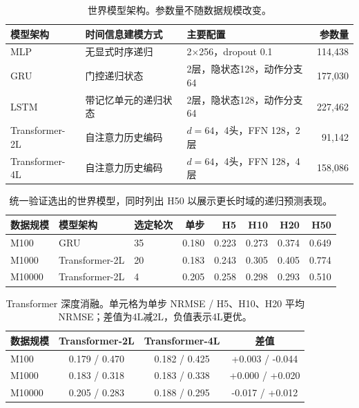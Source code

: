 
\begin{table}[H]
\centering
\caption{世界模型架构。参数量不随数据规模改变。}
\label{tab:architectures}
\small
\begin{tabularx}{\textwidth}{lXXr}
\toprule
模型架构 & 时间信息建模方式 & 主要配置 & 参数量 \\
\midrule
MLP & 无显式时序递归 & 2$\times$256，dropout 0.1 & 114,438 \\
GRU & 门控递归状态 & 2层，隐状态128，动作分支64 & 177,030 \\
LSTM & 带记忆单元的递归状态 & 2层，隐状态128，动作分支64 & 227,462 \\
Transformer-2L & 自注意力历史编码 & $d=64$，4头，FFN 128，2层 & 91,142 \\
Transformer-4L & 自注意力历史编码 & $d=64$，4头，FFN 128，4层 & 158,086 \\
\bottomrule
\end{tabularx}
\end{table}


\begin{table}[H]
\centering
\caption{统一验证选出的世界模型，同时列出 H50 以展示更长时域的递归预测表现。}
\label{tab:selected_wm}
\small
\begin{tabular}{lllrrrrr}
\toprule
数据规模 & 模型架构 & 选定轮次 & 单步 & H5 & H10 & H20 & H50 \\
\midrule
M100 & GRU & 35 & 0.180 & 0.223 & 0.273 & 0.374 & 0.649 \\
M1000 & Transformer-2L & 20 & 0.183 & 0.243 & 0.305 & 0.405 & 0.774 \\
M10000 & Transformer-2L & 4 & 0.205 & 0.258 & 0.298 & 0.293 & 0.510 \\
\bottomrule
\end{tabular}
\end{table}


\begin{table}[H]
\centering
\caption{Transformer 深度消融。单元格为单步 NRMSE / H5、H10、H20 平均 NRMSE；差值为4L减2L，负值表示4L更优。}
\label{tab:depth}
\small
\begin{tabular}{lccc}
\toprule
数据规模 & Transformer-2L & Transformer-4L & 差值 \\
\midrule
M100 & 0.179 / 0.470 & 0.182 / 0.425 & +0.003 / -0.044 \\
M1000 & 0.183 / 0.318 & 0.183 / 0.338 & +0.000 / +0.020 \\
M10000 & 0.205 / 0.283 & 0.188 / 0.295 & -0.017 / +0.012 \\
\bottomrule
\end{tabular}
\end{table}


